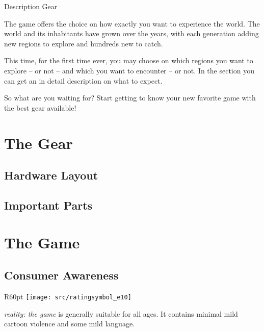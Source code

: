 Description Gear \medskip

The game offers the choice on how exactly you want to experience the \poke{} world. The world and its inhabitants have grown over the years, with each generation adding new regions to explore and hundreds new \poke{} to catch.

This time, for the first time ever, you may choose on which regions you want to explore -- or not -- and which  \poke{} you want to encounter -- or not. In the section \textit{} you can get an in detail description on what to expect.

So what are you waiting for? Start getting to know your new favorite \poke{} game with the best gear available!


\chapter{The Gear}


\section{Hardware Layout}


\section{Important Parts}


\chapter{The Game}

\section{Consumer Awareness}
\label{software}
\begin{wrapfigure}{R}{60pt}
\vspace{-18pt}
\texttt{[image: src/ratingsymbol\_e10]}
\vspace{-30pt}
\end{wrapfigure}
\emph{\poke{} reality: the game} is generally suitable for all ages. It contains minimal mild cartoon violence and some mild language.

